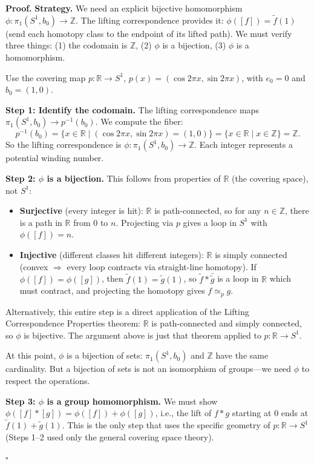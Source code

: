 \documentclass[11pt]{report}
\renewenvironment{proof}[1][Proof]{\noindent\textbf{#1.} }{\hfill$\square$\par\vspace{5pt}}
\begin{document}
\begin{proof}
\textbf{Strategy.} We need an explicit bijective homomorphism $\phi: \pi_1(S^1, b_0) \to \mathbb{Z}$. The lifting correspondence provides it: $\phi([f]) = \tilde{f}(1)$ (send each homotopy class to the endpoint of its lifted path). We must verify three things: (1) the codomain is $\mathbb{Z}$, (2) $\phi$ is a bijection, (3) $\phi$ is a homomorphism.

Use the covering map $p: \mathbb{R} \to S^1$, $p(x) = (\cos 2\pi x, \sin 2\pi x)$, with $e_0 = 0$ and $b_0 = (1, 0)$.

\textbf{Step 1: Identify the codomain.} The lifting correspondence maps $\pi_1(S^1, b_0) \to p^{-1}(b_0)$. We compute the fiber:
\[p^{-1}(b_0) = \{x \in \mathbb{R} \mid (\cos 2\pi x, \sin 2\pi x) = (1,0)\} = \{x \in \mathbb{R} \mid x \in \mathbb{Z}\} = \mathbb{Z}.\]
So the lifting correspondence is $\phi: \pi_1(S^1, b_0) \to \mathbb{Z}$. Each integer represents a potential winding number.

\textbf{Step 2: $\phi$ is a bijection.} This follows from properties of $\mathbb{R}$ (the covering space), not $S^1$:
\begin{itemize}[nosep]
    \item \textbf{Surjective} (every integer is hit): $\mathbb{R}$ is path-connected, so for any $n \in \mathbb{Z}$, there is a path in $\mathbb{R}$ from $0$ to $n$. Projecting via $p$ gives a loop in $S^1$ with $\phi([f]) = n$.
    \item \textbf{Injective} (different classes hit different integers): $\mathbb{R}$ is simply connected (convex $\Rightarrow$ every loop contracts via straight-line homotopy). If $\phi([f]) = \phi([g])$, then $\tilde{f}(1) = \tilde{g}(1)$, so $\tilde{f} * \bar{\tilde{g}}$ is a loop in $\mathbb{R}$ which must contract, and projecting the homotopy gives $f \simeq_p g$.
\end{itemize}
Alternatively, this entire step is a direct application of the Lifting Correspondence Properties theorem: $\mathbb{R}$ is path-connected and simply connected, so $\phi$ is bijective. The argument above is just that theorem applied to $p: \mathbb{R} \to S^1$.

At this point, $\phi$ is a bijection of sets: $\pi_1(S^1, b_0)$ and $\mathbb{Z}$ have the same cardinality. But a bijection of sets is not an isomorphism of groups---we need $\phi$ to respect the operations.

\textbf{Step 3: $\phi$ is a group homomorphism.} We must show $\phi([f] * [g]) = \phi([f]) + \phi([g])$, i.e., the lift of $f * g$ starting at $0$ ends at $\tilde{f}(1) + \tilde{g}(1)$. This is the only step that uses the specific geometry of $p: \mathbb{R} \to S^1$ (Steps 1--2 used only the general covering space theory).


\end{proof}
\end{document}
